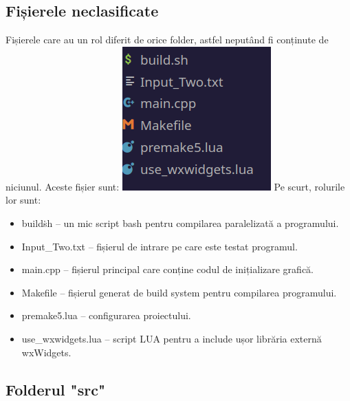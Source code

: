 \documentclass[12pt, twoside]{article}
\begin{document}
\subsection{Fișierele neclasificate}
Fișierele care au un rol diferit de orice folder, astfel
neputând fi conținute de niciunul. Aceste fișier sunt:
\newline
\includegraphics{neclass.png}
\newline
Pe scurt, rolurile lor sunt:
\begin{itemize}
  \item build\.sh -- un mic script bash pentru compilarea paralelizată a programului.
  \item Input\_Two.txt -- fișierul de intrare pe care este testat programul.
  \item main.cpp -- fișierul principal care conține codul de inițializare grafică.
  \item Makefile -- fișierul generat de build system pentru compilarea programului.
  \item premake5.lua -- configurarea proiectului.
  \item use\_wxwidgets.lua -- script LUA pentru a include ușor librăria externă wxWidgets.
\end{itemize}

\subsection{Folderul "src"}
\end{document}
